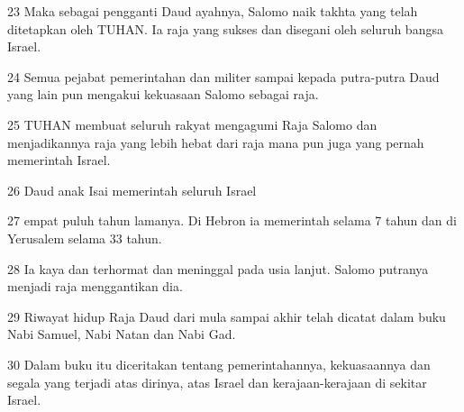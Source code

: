 \par 23 Maka sebagai pengganti Daud ayahnya, Salomo naik takhta yang telah ditetapkan oleh TUHAN. Ia raja yang sukses dan disegani oleh seluruh bangsa Israel.
\par 24 Semua pejabat pemerintahan dan militer sampai kepada putra-putra Daud yang lain pun mengakui kekuasaan Salomo sebagai raja.
\par 25 TUHAN membuat seluruh rakyat mengagumi Raja Salomo dan menjadikannya raja yang lebih hebat dari raja mana pun juga yang pernah memerintah Israel.
\par 26 Daud anak Isai memerintah seluruh Israel
\par 27 empat puluh tahun lamanya. Di Hebron ia memerintah selama 7 tahun dan di Yerusalem selama 33 tahun.
\par 28 Ia kaya dan terhormat dan meninggal pada usia lanjut. Salomo putranya menjadi raja menggantikan dia.
\par 29 Riwayat hidup Raja Daud dari mula sampai akhir telah dicatat dalam buku Nabi Samuel, Nabi Natan dan Nabi Gad.
\par 30 Dalam buku itu diceritakan tentang pemerintahannya, kekuasaannya dan segala yang terjadi atas dirinya, atas Israel dan kerajaan-kerajaan di sekitar Israel.


